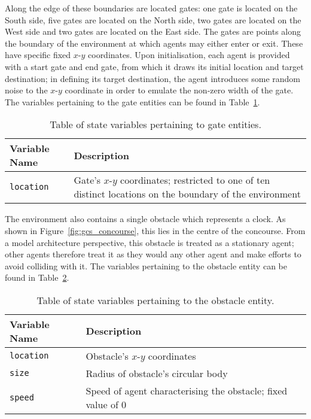 Along the edge of these boundaries are located gates: one gate is located on the
South side, five gates are located on the North side, two gates are located on
the West side and two gates are located on the East side.
The gates are points along the boundary of the environment at which agents may
either enter or exit.
These have specific fixed $x$-$y$ coordinates.
Upon initialisation, each agent is provided with a start gate and end gate, from
which it draws its initial location and target destination; in defining its
target destination, the agent introduces some random noise to the $x$-$y$
coordinate in order to emulate the non-zero width of the gate.
The variables pertaining to the gate entities can be found in
Table~\ref{tab:gate_variables}.

\begin{table}
    \centering
    \begin{tabularx}{\textwidth}{lX}
        \toprule
        Variable Name & Description \\
        \midrule
        \texttt{location} & Gate's $x$-$y$ coordinates; restricted to one of ten
                            distinct locations on the boundary of the
                            environment \\
        \bottomrule
    \end{tabularx}
    \caption{Table of state variables pertaining to gate entities.}
    \label{tab:gate_variables}
\end{table}

The environment also contains a single obstacle which represents a clock.
As shown in Figure~\ref{fig:gcs_concourse}, this lies in the centre of the
concourse.
From a model architecture perspective, this obstacle is treated as a stationary
agent; other agents therefore treat it as they would any other agent and make
efforts to avoid colliding with it.
The variables pertaining to the obstacle entity can be found in
Table~\ref{tab:obstacle_variables}.

\begin{table}
    \centering
    \begin{tabularx}{\textwidth}{lX}
        \toprule
        Variable Name & Description \\
        \midrule
        \texttt{location} & Obstacle's $x$-$y$ coordinates \\
        \texttt{size} & Radius of obstacle's circular body \\
        \texttt{speed} & Speed of agent characterising the obstacle; fixed value
                         of 0 \\
        \bottomrule
    \end{tabularx}
    \caption{Table of state variables pertaining to the obstacle entity.}
    \label{tab:obstacle_variables}
\end{table}

